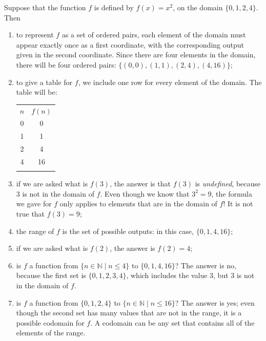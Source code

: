 \begin{example}{}
Suppose that the function $f$ is defined by $f(x)=x^2$, on the domain $\{0,1,2,4\}$.  Then
\begin{enumerate}
\item to represent $f$ as a set of ordered pairs, each element of the domain must appear exactly once as a first coordinate, with the corresponding output given in the second coordinate.  Since there are four elements in the domain, there will be four ordered pairs: $\{(0,0), (1,1), (2,4), (4,16)\}$;
\item to give a table for $f$, we include one row for every element of the domain.  The table will be:
\begin{center}
\begin{tabular}{|c|c|}
\noalign{\hrule}
$n$ & $f(n)$ \\
\noalign{\hrule}
0 & 0 \\
 1 & 1 \\
 2  & 4 \\
 4 & 16 \\
\noalign{\hrule}
\end{tabular}
\end{center}
\item if we are asked what is $f(3)$, the answer is that $f(3)$ is \emph{undefined}, because 3 is not in the domain of $f$.  Even though we know that $3^2=9$, the formula we gave for $f$ only applies to elements that are in the domain of $f$! It is not true that $f(3)=9$;
\item the range of $f$ is the set of possible outputs: in this case, $\{0,1,4,16\}$;
\item if we are asked what is $f(2)$, the answer is $f(2)=4$;
\item is $f$ a function from $\{n \in \mathbb{N} \mid n \le 4\}$ to $\{0,1,4,16\}$?  The answer is no, because the first set is $\{0,1,2,3,4\}$, which includes the value $3$, but $3$ is not in the domain of $f$.
\item is $f$ a function from $\{0,1,2,4\}$ to $\{ n \in \mathbb{N} \mid n \le 16\}$?  The answer is yes; even though the second set has many values that are not in the range, it is a possible codomain for $f$.  A codomain can be any set that contains all of the elements of the range.
\end{enumerate}
\end{example}


